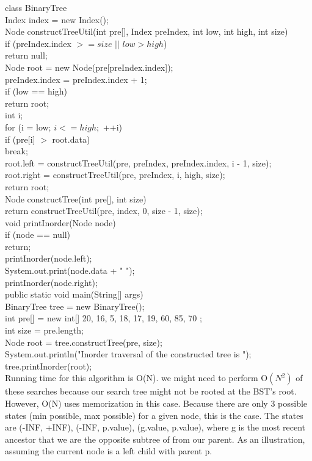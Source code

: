 \documentclass[margin=3mm]{article}
\begin{document}
\begin{enumerate}
class BinaryTree \\
	Index index = new Index();\\
	Node constructTreeUtil(int pre[], Index preIndex, int low, int high, int size)\\
		if (preIndex.index $>= size$ $||$ $low > high$)\\
			return null;\\
		Node root = new Node(pre[preIndex.index]);\\
		preIndex.index = preIndex.index + 1;\\
		if (low == high) \\
			return root;\\
		int i;\\
		for (i = low; $i <= high;$ ++i)\\ 
			if (pre[i] $>$ root.data)\\
				break;\\
		root.left = constructTreeUtil(pre, preIndex, preIndex.index, i - 1, size);\\
		root.right = constructTreeUtil(pre, preIndex, i, high, size);\\
		return root;\\
		
	Node constructTree(int pre[], int size)\\
		return constructTreeUtil(pre, index, 0, size - 1, size);\\
		
	void printInorder(Node node)\\
		if (node == null) \\
			return;\\
		printInorder(node.left);\\
		System.out.print(node.data + " ");\\
		printInorder(node.right);\\
		
	public static void main(String[] args)\\
		BinaryTree tree = new BinaryTree();\\
		int pre[] = new int[] { 20, 16, 5, 18, 17, 19, 60, 85, 70 };\\
		int size = pre.length;\\
		Node root = tree.constructTree(pre, size);\\
		System.out.println("Inorder traversal of the constructed tree is ");\\
		tree.printInorder(root);\\

Running time for this algorithm is O(N). we might need to perform O$(N^2)$ of these searches because our search tree might not be rooted at the BST's root. However, O(N) uses memorization in this case. Because there are only 3 possible states (min possible, max possible) for a given node, this is the case. The states are (-INF, +INF), (-INF, p.value), (g.value, p.value), where g is the most recent ancestor that we are the opposite subtree of from our parent. As an illustration, assuming the current node is a left child with parent p.\\


\end{enumerate}
\end{document}
